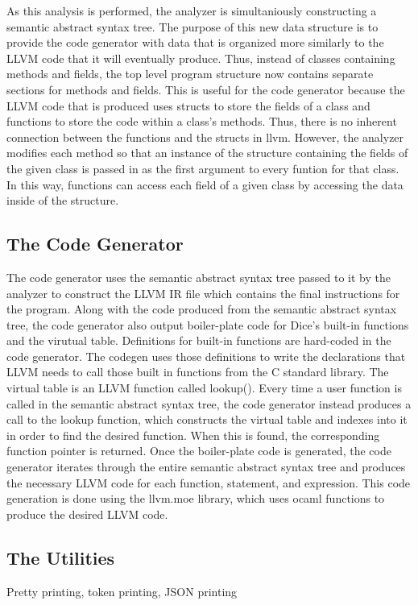 \begin{homeworkProblem}
    As this analysis is performed, the analyzer is simultaniously constructing a semantic abstract syntax tree. The purpose of this new data structure is to provide the code generator with data that is organized more similarly to the LLVM code that it will eventually produce. Thus, instead of classes containing methods and fields, the top level program structure now contains separate sections for methods and fields. This is useful for the code generator because the LLVM code that is produced uses structs to store the fields of a class and functions to store the code within a class's methods. Thus, there is no inherent connection between the functions and the structs in llvm. However, the analyzer modifies each method so that an instance of the structure containing the fields of the given class is passed in as the first argument to every funtion for that class. In this way, functions can access each field of a given class by accessing the data inside of the structure. 

	\subsection{The Code Generator}
    
    The code generator uses the semantic abstract syntax tree passed to it by the analyzer to construct the LLVM IR file which contains the final instructions for the program. Along with the code produced from the semantic abstract syntax tree, the code generator also output boiler-plate code for Dice's built-in functions and the virutual table. Definitions for built-in functions are hard-coded in the code generator. The codegen uses those definitions to write the declarations that LLVM needs to call those built in functions from the C standard library. The virtual table is an LLVM function called lookup(). Every time a user function is called in the semantic abstract syntax tree, the code generator instead produces a call to the lookup function, which constructs the virtual table and indexes into it in order to find the desired function. When this is found, the corresponding function pointer is returned. 
    Once the boiler-plate code is generated, the code generator iterates through the entire semantic abstract syntax tree and produces the necessary LLVM code for each function, statement, and expression. This code generation is done using the llvm.moe library, which uses ocaml functions to produce the desired LLVM code. 


	\subsection{The Utilities}
	Pretty printing, token printing, JSON printing

\end{homeworkProblem}
